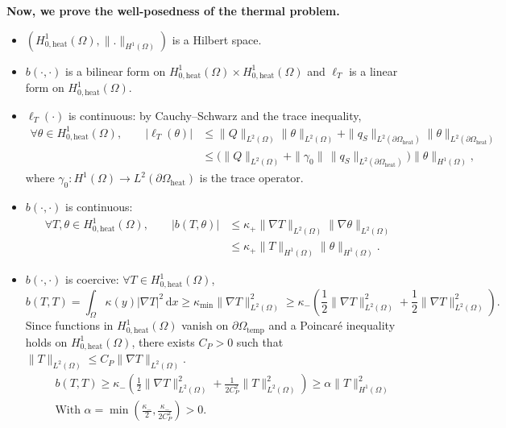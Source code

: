 \documentclass[a4paper,12pt,twoside]{report}
\begin{document}
\noindent \textbf{Now, we prove the well-posedness of the thermal problem.} 
\begin{itemize}
	\item $(H^1_{0,\text{heat}}(\Omega),\|.\|_{H^1(\Omega)})$ is a Hilbert space.
	\item $b(\cdot,\cdot)$ is a bilinear form on $H^1_{0,\text{heat}}(\Omega)\times H^1_{0,\text{heat}}(\Omega)$ and $\ell_T$ is a linear form on $H^1_{0,\text{heat}}(\Omega)$.
	\item $\ell_T(\cdot)$ is continuous: by Cauchy--Schwarz and the trace inequality,
	\begin{equation*}
	\begin{aligned}
	\forall \theta\in H^1_{0,\text{heat}}(\Omega),\qquad
	|\ell_T(\theta)|
	&\le \|Q\|_{L^2(\Omega)}\|\theta\|_{L^2(\Omega)} + \|q_S\|_{L^2(\partial\Omega_{\mathrm{heat}})}\|\theta\|_{L^2(\partial\Omega_{\mathrm{heat}})}\\
	&\le \Big(\|Q\|_{L^2(\Omega)} + \|\gamma_0\|\,\|q_S\|_{L^2(\partial\Omega_{\mathrm{heat}})}\Big)\|\theta\|_{H^1(\Omega)},
	\end{aligned}
	\end{equation*}
	where $\gamma_0: H^1(\Omega)\to L^2(\partial\Omega_{\mathrm{heat}})$ is the trace operator.
	\item $b(\cdot,\cdot)$ is continuous:
	\begin{equation*}
	\begin{aligned}
	\forall T,\theta\in H^1_{0,\text{heat}}(\Omega),\qquad
	|b(T,\theta)|
	&\le \kappa_{+}\|\nabla T\|_{L^2(\Omega)}\|\nabla\theta\|_{L^2(\Omega)}\\
	&\le \kappa_{+}\|T\|_{H^1(\Omega)}\|\theta\|_{H^1(\Omega)}.
	\end{aligned}
	\end{equation*}
	\item $b(\cdot,\cdot)$ is coercive: $\forall T\in H^1_{0,\text{heat}}(\Omega)$,
	\begin{equation*}
	b(T,T)=\int_\Omega \kappa(y)|\nabla T|^2\,\mathrm{d}x \ge \kappa_{\min}\|\nabla T\|_{L^2(\Omega)}^2 \ge \kappa_{-} \left( \frac{1}{2}  \|\nabla T\|_{L^2(\Omega)}^2 + \frac{1}{2}\|\nabla T\|_{L^2(\Omega)}^2\right).
	\end{equation*}
	Since functions in $H^1_{0,\text{heat}}(\Omega)$ vanish on $\partial\Omega_{\mathrm{temp}}$ and a Poincaré inequality holds on $H^1_{0,\text{heat}}(\Omega)$, there exists $C_P>0$ such that $\|T\|_{L^2(\Omega)}\le C_P\|\nabla T\|_{L^2(\Omega)}$. 
	\begin{equation*}
		\begin{aligned}
		& b(T,T) \ge \kappa_{-} \left( \frac{1}{2}  \|\nabla T\|_{L^2(\Omega)}^2 + \frac{1}{2C_P^2}\|T\|_{L^2(\Omega)}^2\right) \ge \alpha\|T\|_{H^1(\Omega)}^2 \\
		& \text{With } \alpha = \min\left(\frac{\kappa_{-}}{2}, \frac{\kappa_{-}}{2C_P^2}\right) > 0.
		\end{aligned}
	\end{equation*}
\end{itemize}
\end{document}
